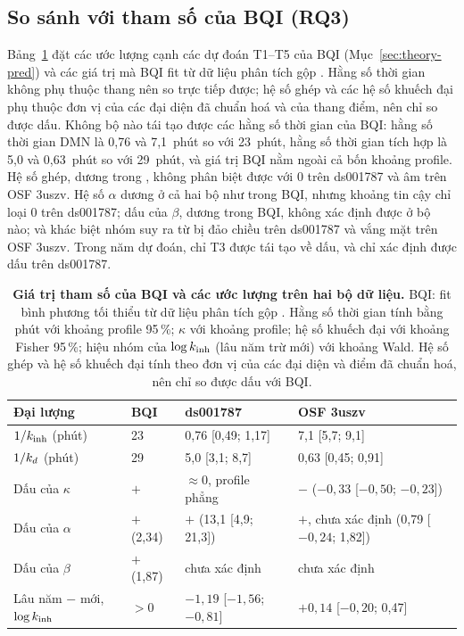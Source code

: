 \subsection{So sánh với tham số của BQI (RQ3)}
\label{sec:res-bqi}
Bảng~\ref{tab:bqi} đặt các ước lượng cạnh các dự đoán T1--T5 của BQI (Mục~\ref{sec:theory-pred}) và các giá trị mà BQI fit từ dữ liệu phân tích gộp \cite[Bảng~5]{BQI}. Hằng số thời gian không phụ thuộc thang nên so trực tiếp được; hệ số ghép và các hệ số khuếch đại phụ thuộc đơn vị của các đại diện đã chuẩn hoá và của thang điểm, nên chỉ so được dấu. Không bộ nào tái tạo được các hằng số thời gian của BQI: hằng số thời gian DMN là 0,76 và 7,1~phút so với 23~phút, hằng số thời gian tích hợp là 5,0 và 0,63~phút so với 29~phút, và giá trị BQI nằm ngoài cả bốn khoảng profile. Hệ số ghép, dương trong \cite[pt.~(53)]{BQI}, không phân biệt được với 0 trên ds001787 và âm trên OSF 3uszv. Hệ số $\alpha$ dương ở cả hai bộ như trong BQI, nhưng khoảng tin cậy chỉ loại 0 trên ds001787; dấu của $\beta$, dương trong BQI, không xác định được ở bộ nào; và khác biệt nhóm suy ra từ \cite[pt.~(51) và Mục~7.5]{BQI} bị đảo chiều trên ds001787 và vắng mặt trên OSF 3uszv. Trong năm dự đoán, chỉ T3 được tái tạo về dấu, và chỉ xác định được dấu trên ds001787.

\begin{table}[t]
\caption{\textbf{Giá trị tham số của BQI và các ước lượng trên hai bộ dữ liệu.} BQI: fit bình phương tối thiểu từ dữ liệu phân tích gộp \cite[Bảng~5]{BQI}. Hằng số thời gian tính bằng phút với khoảng profile 95\,\%; $\kappa$ với khoảng profile; hệ số khuếch đại với khoảng Fisher 95\,\%; hiệu nhóm của $\log k_{\mathrm{inh}}$ (lâu năm trừ mới) với khoảng Wald. Hệ số ghép và hệ số khuếch đại tính theo đơn vị của các đại diện và điểm đã chuẩn hoá, nên chỉ so được dấu với BQI.}
\label{tab:bqi}
\centering\footnotesize
\setlength{\tabcolsep}{5pt}
\begin{tabular}{llll}
\toprule
Đại lượng & BQI & ds001787 & OSF 3uszv \\
\midrule
$1/k_{\mathrm{inh}}$ (phút) & 23 & 0,76 [0,49; 1,17] & 7,1 [5,7; 9,1] \\
$1/k_{d}$ (phút) & 29 & 5,0 [3,1; 8,7] & 0,63 [0,45; 0,91] \\
Dấu của $\kappa$ & $+$ & $\approx0$, profile phẳng & $-$ ($-0{,}33$ [$-0{,}50$; $-0{,}23$]) \\
Dấu của $\alpha$ & $+$ (2,34) & $+$ (13,1 [4,9; 21,3]) & $+$, chưa xác định (0,79 [$-0{,}24$; 1,82]) \\
Dấu của $\beta$ & $+$ (1,87) & chưa xác định & chưa xác định \\
Lâu năm $-$ mới, $\log k_{\mathrm{inh}}$ & $>0$ & $-1{,}19$ [$-1{,}56$; $-0{,}81$] & $+0{,}14$ [$-0{,}20$; 0,47] \\
\bottomrule
\end{tabular}
\end{table}


